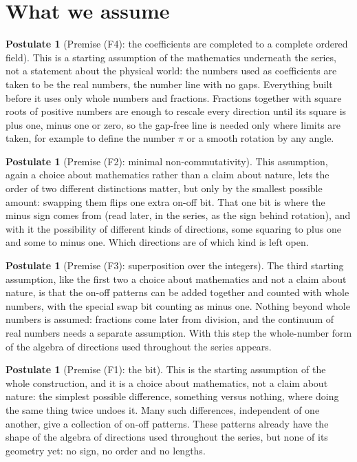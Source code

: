 \documentclass[11pt]{article}
\theoremstyle{definition}
\newtheorem{postulate}[theorem]{Postulate}
\theoremstyle{plain}
\begin{document}
\section{What we assume}

\begin{postulate}[Premise (F4): the coefficients are completed to a complete ordered field]\label{c:synthesis.continuum-completion-premise}
This is a starting assumption of the mathematics underneath the series, not a statement about the physical world: the numbers used as coefficients are taken to be the real numbers, the number line with no gaps. Everything built before it uses only whole numbers and fractions. Fractions together with square roots of positive numbers are enough to rescale every direction until its square is plus one, minus one or zero, so the gap-free line is needed only where limits are taken, for example to define the number $\pi$ or a smooth rotation by any angle.
\end{postulate}

\begin{postulate}[Premise (F2): minimal non-commutativity]\label{c:synthesis.premise-minimal-non-commutativity}
This assumption, again a choice about mathematics rather than a claim about nature, lets the order of two different distinctions matter, but only by the smallest possible amount: swapping them flips one extra on-off bit. That one bit is where the minus sign comes from (read later, in the series, as the sign behind rotation), and with it the possibility of different kinds of directions, some squaring to plus one and some to minus one. Which directions are of which kind is left open.
\end{postulate}

\begin{postulate}[Premise (F3): superposition over the integers]\label{c:synthesis.premise-superposition-over-the-integers}
The third starting assumption, like the first two a choice about mathematics and not a claim about nature, is that the on-off patterns can be added together and counted with whole numbers, with the special swap bit counting as minus one. Nothing beyond whole numbers is assumed: fractions come later from division, and the continuum of real numbers needs a separate assumption. With this step the whole-number form of the algebra of directions used throughout the series appears.
\end{postulate}

\begin{postulate}[Premise (F1): the bit]\label{c:synthesis.premise-the-bit}
This is the starting assumption of the whole construction, and it is a choice about mathematics, not a claim about nature: the simplest possible difference, something versus nothing, where doing the same thing twice undoes it. Many such differences, independent of one another, give a collection of on-off patterns. These patterns already have the shape of the algebra of directions used throughout the series, but none of its geometry yet: no sign, no order and no lengths.
\end{postulate}
\end{document}
